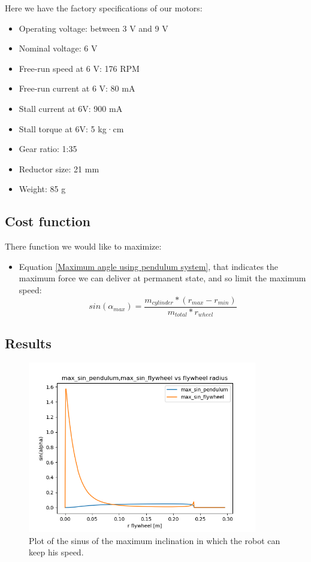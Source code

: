 Here we have the factory specifications of our motors: 
\begin{itemize}
    \item Operating voltage: between 3 V and 9 V
    \item Nominal voltage: 6 V
    \item Free-run speed at 6 V: 176 RPM
    \item Free-run current at 6 V: 80 mA
    \item Stall current at 6V: 900 mA
    \item Stall torque at 6V: 5 kg·cm
    \item Gear ratio: 1:35
    \item Reductor size: 21 mm
    \item Weight: 85 g
\end{itemize}

\subsection{Cost function}
There function we would like to maximize:
\begin{itemize}
    \item Equation \ref{Maximum angle using pendulum system}, that indicates the maximum force we can deliver at permanent state, and so limit the maximum speed:
     \[sin(\alpha_{max}) = \frac{m_{cylinder} * (r_{max}- r_{min})}{m_{total} * r_{wheel}}\]
\end{itemize}

\subsection{Results}

\begin{figure}[ht]
	\centering
	\includegraphics[width=10cm]{img/optimization/sin.png}
	\caption{Plot of the sinus of the maximum inclination in which the robot can keep his speed.}
	\label{fig:Sinus plot}
\end{figure}


